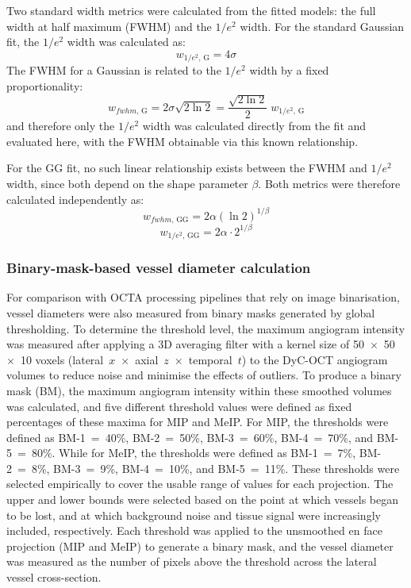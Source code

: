 \documentclass{optica-article}
\begin{document}
Two standard width metrics were calculated from the fitted models: the full width at half maximum (FWHM) and the $1/e^2$ width. For the standard Gaussian fit, the $1/e^2$ width was calculated as:
\begin{equation}
\label{eq:gauss_1e2}
w_{1/e^2,\,\mathrm{G}} = 4\sigma
\end{equation}
The FWHM for a Gaussian is related to the $1/e^2$ width by a fixed proportionality:
\begin{equation}
\label{eq:gauss_fwhm}
w_{fwhm,\,\mathrm{G}} = 2\sigma\sqrt{2\ln 2} = \frac{\sqrt{2\ln 2}}{2} \; w_{1/e^2,\,\mathrm{G}}
\end{equation}
and therefore only the $1/e^2$ width was calculated directly from the fit and evaluated here, with the FWHM obtainable via this known relationship.

For the GG fit, no such linear relationship exists between the FWHM and $1/e^2$ width, since both depend on the shape parameter $\beta$. Both metrics were therefore calculated independently as:
\begin{equation}
\label{eq:gg_fwhm}
w_{fwhm,\,\mathrm{GG}} = 2\alpha{\left(\ln 2\right)}^{1/\beta}
\end{equation}
\begin{equation}
\label{eq:gg_1e2}
w_{1/e^2,\,\mathrm{GG}} = 2\alpha \cdot 2^{1/\beta}
\end{equation}

\subsubsection{Binary-mask-based vessel diameter calculation}
\label{subsubsec:binary_mask}
For comparison with OCTA processing pipelines that rely on image binarisation, vessel diameters were also measured from binary masks generated by global thresholding. To determine the threshold level, the maximum angiogram intensity was measured after applying a 3D averaging filter with a kernel size of 50~$\times$~50~$\times$~10 voxels (lateral~$x$~$\times$~axial~$z$~$\times$~temporal~$t$) to the DyC-OCT angiogram volumes to reduce noise and minimise the effects of outliers. To produce a binary mask (BM), the maximum angiogram intensity within these smoothed volumes was calculated, and five different threshold values were defined as fixed percentages of these maxima for MIP and MeIP. For MIP, the thresholds were defined as BM-1~=~40\%, BM-2~=~50\%, BM-3~=~60\%, BM-4~=~70\%, and BM-5~=~80\%. While for MeIP, the thresholds were defined as BM-1~=~7\%, BM-2~=~8\%, BM-3~=~9\%, BM-4~=~10\%, and BM-5~=~11\%. These thresholds were selected empirically to cover the usable range of values for each projection. The upper and lower bounds were selected based on the point at which vessels began to be lost, and at which background noise and tissue signal were increasingly included, respectively. Each threshold was applied to the unsmoothed en face projection (MIP and MeIP) to generate a binary mask, and the vessel diameter was measured as the number of pixels above the threshold across the lateral vessel cross-section.
\end{document}
